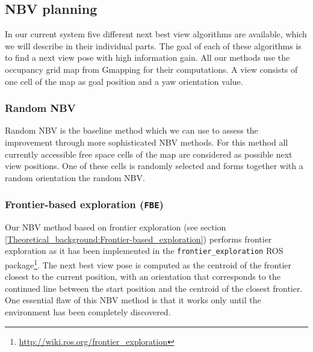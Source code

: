 \documentclass[a4paper,11pt,english]{article}
\begin{document}




\subsection{NBV planning}
In our current system five different next best view algorithms are available, which we will describe in their individual parts.
The goal of each of these algorithms is to find a next view pose with high information gain.
All our methods use the occupancy grid map from Gmapping for their computations.
A view consists of one cell of the map as goal position and a yaw orientation value.

\subsubsection{Random NBV}
Random NBV is the baseline method which we can use to assess the improvement through more sophisticated NBV methods.
For this method all currently accessible free space cells of the map are considered as possible next view positions.
One of these cells is randomly selected and forms together with a random orientation the random NBV.

\subsubsection{Frontier-based exploration (\texttt{FBE})}
Our NBV method based on frontier exploration (see section \ref{Theoretical_background:Frontier-based_exploration}) performs frontier exploration as it has been implemented in the \texttt{frontier\_exploration} ROS package\footnote{\url{http://wiki.ros.org/frontier_exploration}}.
The next best view pose is computed as the centroid of the frontier closest to the current position, with an orientation that corresponds to the continued line between the start position and the centroid of the closest frontier.
One essential flaw of this NBV method is that it works only until the environment has been completely discovered.
\end{document}
